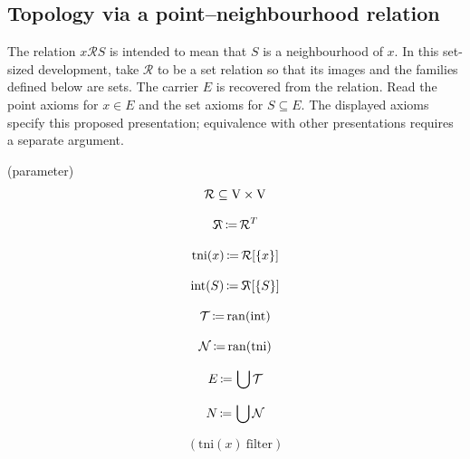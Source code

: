 \subsection{Topology via a point--neighbourhood relation}
The relation $x\mathcal{R}S$ is intended to mean that $S$ is a
neighbourhood of $x$. In this set-sized development, take $\mathcal{R}$
to be a set relation so that its images and the families defined below
are sets. The carrier $E$ is recovered from the relation. Read the
point axioms for $x\in E$ and the set axioms for $S\subseteq E$.
The displayed axioms specify this proposed presentation; equivalence
with other presentations requires a separate argument.
\begin{definition}(parameter)
\[
\mathcal{R}\subseteq \mathrm{V}\times \mathrm{V}
\]
\end{definition}
\begin{definition}
\[
\reflectbox{$\mathcal{R}$}\ceq \mathcal{R}^{T}
\]
\end{definition}
\begin{definition}
\[
\mathrm{tni}(x)\,{\coloneqq}\, \mathcal{R}[\{x\}]
\]
\end{definition}
\begin{definition}
\[
\interior(S)\ceq \reflectbox{$\mathcal{R}$}[\{S\}]
\]
\end{definition}
\begin{definition}
\[
\mathcal{T}\,{\coloneqq}\, \mathrm{ran}(\mathrm{int})
\]
\end{definition}
\begin{definition}
\[
\mathcal{N}\,{\coloneqq}\, \mathrm{ran}(\mathrm{tni})
\]
\end{definition}
\begin{definition}
\[
E\,{\coloneqq}\, \bigcup\mathcal{T}
\]
\end{definition}
\begin{definition}
\[
N\,{\coloneqq}\, \bigcup\mathcal{N}
\]
\end{definition}

\begin{axiom*}[N$_0$]
\[
(\mathrm{tni}(x)\ \mathrm{filter})
\]
\end{axiom*}


